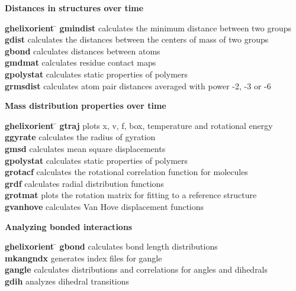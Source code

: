 \begin{description}
\item {\large\bf Distances in structures over time}
\vspace{-2ex}\begin{tabbing}
{\bf g\us{}helixorient} \= \kill
{\bf g\us{}mindist} \> calculates the minimum distance between two groups \\
{\bf g\us{}dist} \> calculates the distances between the centers of mass of two groups \\
{\bf g\us{}bond} \> calculates distances between atoms \\
{\bf g\us{}mdmat} \> calculates residue contact maps \\
{\bf g\us{}polystat} \> calculates static properties of polymers \\
{\bf g\us{}rmsdist} \> calculates atom pair distances averaged with power -2, -3 or -6 \\
\end{tabbing}\vspace{-2ex}

\item {\large\bf Mass distribution properties over time}
\vspace{-2ex}\begin{tabbing}
{\bf g\us{}helixorient} \= \kill
{\bf g\us{}traj} \> plots x, v, f, box, temperature and rotational energy \\
{\bf g\us{}gyrate} \> calculates the radius of gyration \\
{\bf g\us{}msd} \> calculates mean square displacements \\
{\bf g\us{}polystat} \> calculates static properties of polymers \\
{\bf g\us{}rotacf} \> calculates the rotational correlation function for molecules \\
{\bf g\us{}rdf} \> calculates radial distribution functions \\
{\bf g\us{}rotmat} \> plots the rotation matrix for fitting to a reference structure \\
{\bf g\us{}vanhove} \> calculates Van Hove displacement functions \\
\end{tabbing}\vspace{-2ex}

\item {\large\bf Analyzing bonded interactions}
\vspace{-2ex}\begin{tabbing}
{\bf g\us{}helixorient} \= \kill
{\bf g\us{}bond} \> calculates bond length distributions \\
{\bf mk\us{}angndx} \> generates index files for g\us{}angle \\
{\bf g\us{}angle} \> calculates distributions and correlations for angles and dihedrals \\
{\bf g\us{}dih} \> analyzes dihedral transitions \\
\end{tabbing}\vspace{-2ex}


\end{description}
